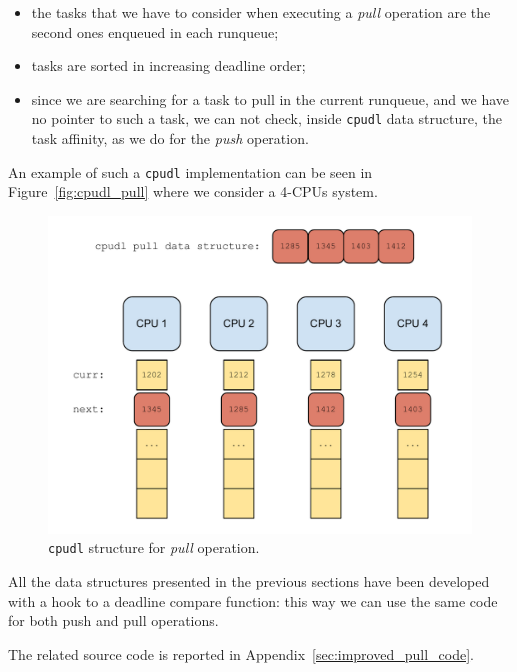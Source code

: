 \begin{itemize}
\item the tasks that we have to consider when executing a \emph{pull}
operation are the second ones enqueued in each runqueue;
\item tasks are sorted in increasing deadline order;
\item since we are searching for a task to pull in the current runqueue,
and we have no pointer to such a task, we can not check, 
inside \texttt{cpudl} data structure, the task affinity, as we do for
the \emph{push} operation.
\end{itemize}

An example of such a \texttt{cpudl} implementation can be seen
in Figure~\vref{fig:cpudl_pull} where we consider a 4-CPUs system.

\begin{figure}[htbp]
    \includegraphics[width=\columnwidth]{images/Pull_cpudl}
    \caption{\texttt{cpudl} structure for \emph{pull} operation.}
    \label{fig:cpudl_pull}
\end{figure}

All the data structures presented in the previous sections have been developed
with a hook to a deadline compare function: this way we can use the same
code for both push and pull operations.

The related source code is reported in Appendix~\ref{sec:improved_pull_code}.
